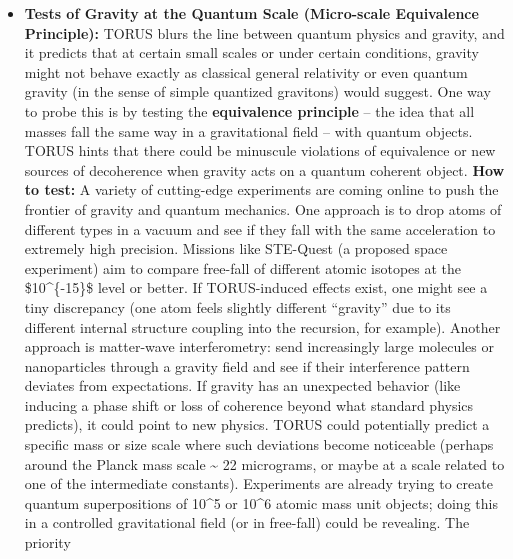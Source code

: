 \documentclass[
]{article}
\begin{document}
{\begin{itemize}
  indicator that our universe has a global self-consistency condition
  (as TORUS posits). If nothing unusual is found, TORUS might still
  survive (since such patterns could be subtle), but it would mean
  there's no large-scale easy signal -- pushing the theory more toward
  the small-scale tests like those above.
\item
  \textbf{Tests of Gravity at the Quantum Scale (Micro-scale Equivalence
  Principle):} TORUS blurs the line between quantum physics and gravity,
  and it predicts that at certain small scales or under certain
  conditions, gravity might not behave exactly as classical general
  relativity or even quantum gravity (in the sense of simple quantized
  gravitons) would suggest. One way to probe this is by testing the
  \textbf{equivalence principle} -- the idea that all masses fall the
  same way in a gravitational field -- with quantum objects. TORUS hints
  that there could be minuscule violations of equivalence or new sources
  of decoherence when gravity acts on a quantum coherent object.
  \textbf{How to test:} A variety of cutting-edge experiments are coming
  online to push the frontier of gravity and quantum mechanics. One
  approach is to drop atoms of different types in a vacuum and see if
  they fall with the same acceleration to extremely high precision.
  Missions like STE-Quest (a proposed space experiment) aim to compare
  free-fall of different atomic isotopes at the \$10\^{}\{-15\}\$ level
  or better\hspace{0pt}. If TORUS-induced effects exist, one might see a
  tiny discrepancy (one atom feels slightly different ``gravity'' due to
  its different internal structure coupling into the recursion, for
  example). Another approach is matter-wave interferometry: send
  increasingly large molecules or nanoparticles through a gravity field
  and see if their interference pattern deviates from expectations. If
  gravity has an unexpected behavior (like inducing a phase shift or
  loss of coherence beyond what standard physics predicts), it could
  point to new physics. TORUS could potentially predict a specific mass
  or size scale where such deviations become noticeable (perhaps around
  the Planck mass scale \textasciitilde{} 22 micrograms, or maybe at a
  scale related to one of the intermediate constants). Experiments are
  already trying to create quantum superpositions of 10\^{}5 or 10\^{}6
  atomic mass unit objects; doing this in a controlled gravitational
  field (or in free-fall) could be revealing\hspace{0pt}. The priority

\end{itemize}}
\end{document}
